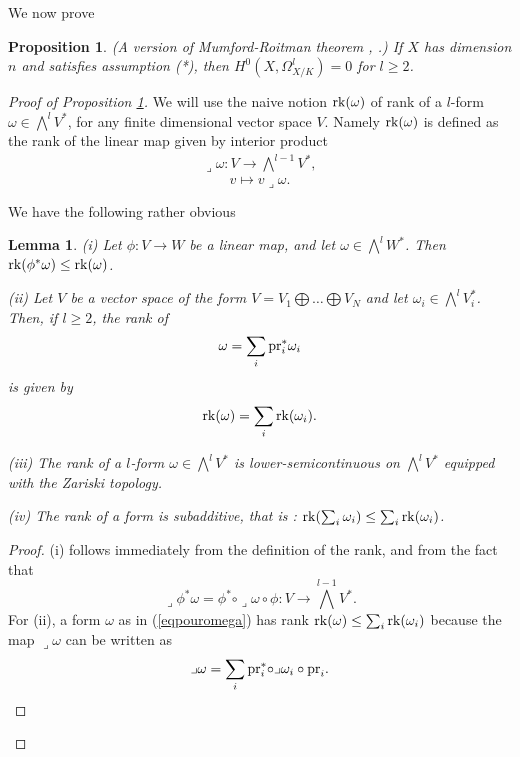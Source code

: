 \documentclass[10pt]{article}
\newtheorem{prop}[theo]{Proposition}
\newtheorem{lemm}[theo]{Lemma}
\begin{document}
We now prove

\begin{prop}\label{theomuro} (A version of Mumford-Roitman theorem \cite{mumford}, \cite{roitman}.) If $X$ has dimension $n$ and  satisfies assumption (*), then
$H^0(X,\Omega_{X/K}^l)=0$ for  $l\geq 2$.
\end{prop}

\begin{proof}[Proof of Proposition  \ref{theomuro}]  We will use  the naive notion ${\rm rk}(\omega)$ of rank  of a $l$-form $\omega\in \bigwedge^l V^*$, for any finite dimensional  vector space $V$. Namely ${\rm rk}(\omega)$ is defined as the rank of
the linear map given by interior product
\begin{eqnarray}\label{eqrankomegatrad} \lrcorner \omega: V\rightarrow \bigwedge^{l-1}V^*,\end{eqnarray}
$$v\mapsto v \lrcorner \omega.$$



We have  the following rather obvious
\begin{lemm}\label{lerank} (i) Let $\phi: V\rightarrow W$ be a linear map, and let $\omega\in\bigwedge^l W^*$. Then  ${\rm rk}(\phi^*\omega)\leq {\rm rk}(\omega)$.

(ii) Let $V$ be a vector space of the form $V=V_1\bigoplus \ldots\bigoplus V_N$ and let $\omega_i\in\bigwedge^lV_i^*$. Then, if $l\geq 2$, the  rank of \begin{eqnarray}\label{eqpouromega} \omega=\sum_i{\rm pr}_i^*\omega_i\end{eqnarray} is given by
\begin{eqnarray}\label{eqrangnaif} {\rm rk}(\omega)=\sum_i{\rm rk}(\omega_i).\end{eqnarray}



(iii) The  rank of a $l$-form $\omega\in \bigwedge^lV^* $  is lower-semicontinuous on $ \bigwedge^lV^* $ equipped with the Zariski topology.

(iv) The rank of a form is subadditive, that is : ${\rm rk}(\sum_i\omega_i)\leq \sum_i{\rm rk} (\omega_i)$.
\end{lemm}
\begin{proof} (i) follows immediately from the definition of the  rank, and from the fact that
$$\lrcorner\phi^*\omega=\phi^*\circ \lrcorner\omega\circ \phi: V\rightarrow \bigwedge^{l-1} V^*.$$
For (ii),  a form $\omega$ as in (\ref{eqpouromega}) has  rank ${\rm rk}(\omega)\leq \sum_i{\rm rk}(\omega_i)$ because the map
$\lrcorner\omega$ can be written as \begin{eqnarray} \label{eqnarraynew11nov} \lrcorner\omega=\sum_i {\rm pr}_i^*\circ \lrcorner\omega_i\circ {\rm pr}_i.  \end{eqnarray}


\end{proof}
\end{proof}
\end{document}
